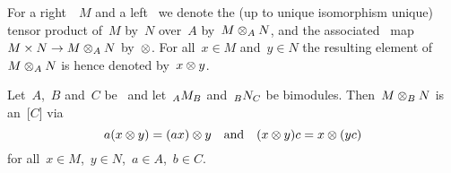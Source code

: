 \begin{notation*}
  For a right~{}~$M$ and a left~{} we denote the (up to unique isomorphism unique) tensor product of~$M$ by~$N$ over~$A$ by~$M \otimes_A N$, and the associated~{} map~$M \times N \to M \otimes_A N$ by~$\otimes$.
  For all~$x \in M$ and~$y \in N$ the resulting element of~$M \otimes_A N$ is hence denoted by~$x \otimes y$.
\end{notation*}


\begin{lemma}
  Let~$A$,~$B$ and~$C$ be~{\kalgs} and let~$\indmodule[A]{M}[B]$ and~$\indmodule[B]{N}[C]$ be bimodules.
  Then~$M \otimes_B N$ is an~{[$C$]} via
  \[
      a (x \otimes y)
    = (ax) \otimes y
    \quad\text{and}\quad
      (x \otimes y) c
    = x \otimes (yc)
  \]
  for all~$x \in M$,~$y \in N$,~$a \in A$,~$b \in C$.
\end{lemma}


